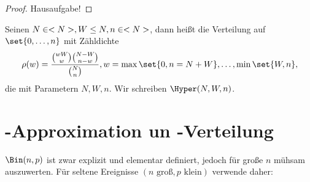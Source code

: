 \begin{proof}
	Hausaufgabe! %
\end{proof}

\begin{definition}
	Seinen $N \in <N>, W \le N, n \in <N>$, dann heißt die Verteilung auf $\set{0,\dots,n}$ mit Zähldichte
	\begin{align}
		\rho(w) = \frac{\binom{wW}{w}\binom{N-W}{n-w}}{\binom{N}{n}}, w = \max\set{0,n=N+W}, \dots, \min\set{W,n},\notag
	\end{align}
	die  mit Parametern $N,W,n$. Wir schreiben $\Hyper(N,W,n)$.
\end{definition}

\section{-Approximation un -Verteilung}

$\Bin(n,p)$ ist zwar explizit und elementar definiert, jedoch für große $n$ mühsam auszuwerten. Für seltene Ereignisse $(n \text{ groß},p \text{ klein})$ verwende daher:

